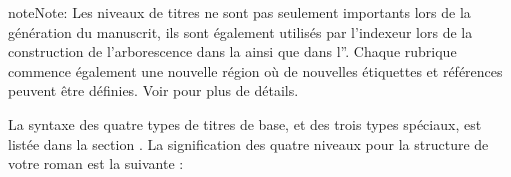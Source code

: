 \documentclass[a4paper,11pt,french]{sphinxmanual}
\begin{document}
\begin{sphinxadmonition}{note}{Note:}
\sphinxAtStartPar
Les niveaux de titres ne sont pas seulement importants lors de la génération du manuscrit, ils sont également utilisés par l’indexeur lors de la construction de l’arborescence dans la  ainsi que dans l”. Chaque rubrique commence également une nouvelle région où de nouvelles étiquettes et références peuvent être définies. Voir {\hyperref[\detokenize{project_references:a-references}]{}} pour plus de détails.
\end{sphinxadmonition}

\sphinxAtStartPar
La syntaxe des quatre types de titres de base, et des trois types spéciaux, est listée dans la section {\hyperref[\detokenize{usage_format:a-fmt-head}]{}}. La signification des quatre niveaux pour la structure de votre roman est la suivante :
\end{document}
